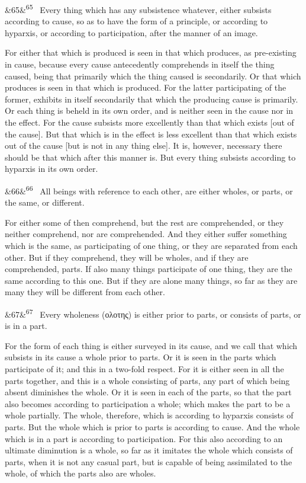 \documentclass[12pt]{article}
\newcommand{\para}[1][]{\par\noindent\ifx&#1&\else\textsuperscript{\footnotesize #1}~\fi}
\begin{document}
\para[65] Every thing which has any subsistence whatever, either subsists according to cause, so as to have the form of a principle, or according to hyparxis, or according to participation, after the manner of an image.

For either that which is produced is seen in that which produces, as pre-existing in cause, because every cause antecedently comprehends in itself the thing caused, being that primarily which the thing caused is secondarily. Or that which produces is seen in that which is produced. For the latter participating of the former, exhibits in itself secondarily that which the producing cause is primarily. Or each thing is beheld in its own order, and is neither seen in the cause nor in the effect. For the cause subsists more excellently than that which exists [out of the cause]. But that which is in the effect is less excellent than that which exists out of the cause [but is not in any thing else]. It is, however, necessary there should be that which after this manner is. But every thing subsists according to hyparxis in its own order.

\para[66] All beings with reference to each other, are either wholes, or parts, or the same, or different.

For either some of then comprehend, but the rest are comprehended, or they neither comprehend, nor are comprehended. And they either suffer something which is the same, as participating of one thing, or they are separated from each other. But if they comprehend, they will be wholes, and if they are comprehended, parts. If also many things participate of one thing, they are the same according to this one. But if they are alone many things, so far as they are many they will be different from each other.

\para[67] Every wholeness (ολοτης) is either prior to parts, or consists of parts, or is in a part.

For the form of each thing is either surveyed in its cause, and we call that which subsists in its cause a whole prior to parts. Or it is seen in the parts which participate of it; and this in a two-fold respect. For it is either seen in all the parts together, and this is a whole consisting of parts, any part of which being absent diminishes the whole. Or it is seen in each of the parts, so that the part also becomes according to participation a whole; which makes the part to be a whole partially. The whole, therefore, which is according to hyparxis consists of parts. But the whole which is prior to parts is according to cause. And the whole which is in a part is according to participation. For this also according to an ultimate diminution is a whole, so far as it imitates the whole which consists of parts, when it is not any casual part, but is capable of being assimilated to the whole, of which the parts also are wholes.
\end{document}

